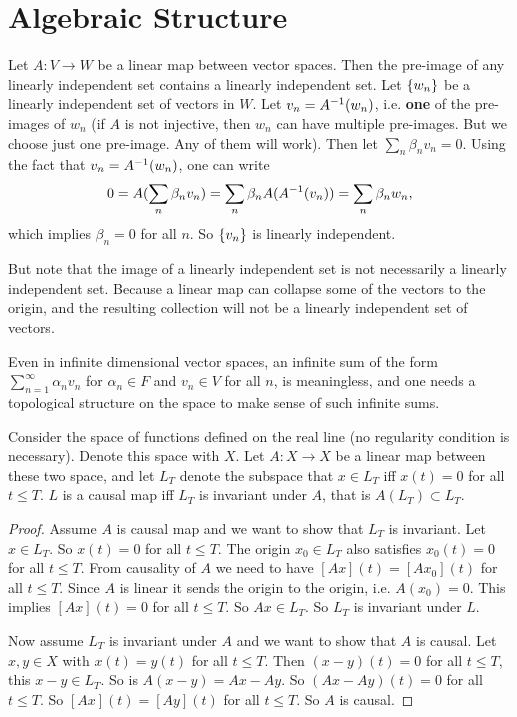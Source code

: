 \chapter{Algebraic Structure}


\begin{summary}
	Let $ A:V\to W $ be a linear map between vector spaces. Then the pre-image of any linearly independent set contains a linearly independent set. Let $ \{w_n\} $ be a linearly independent set of vectors in $ W $. Let $ v_n = A^{-1}(w_n) $, i.e. \textbf{one} of the pre-images of $ w_n $ (if $ A $ is not injective, then $ w_n $ can have multiple pre-images. But we choose just one pre-image. Any of them will work). Then let $ \sum_n \beta_n v_n = 0 $. Using the fact that $ v_n = A^{-1}(w_n) $, one can write
	\[ 0 = A(\sum_n \beta_n v_n) = \sum_n \beta_n A(A^{-1}(v_n)) = \sum_n \beta_n w_n,  \]
	which implies $ \beta_n = 0 $ for all $ n $. So $ \{v_n\} $ is linearly independent.
	
	But note that the image of a linearly independent set is not necessarily a linearly independent set. Because a linear map can collapse some of the vectors to the origin, and the resulting collection will not be a linearly independent set of vectors. 
\end{summary}

\begin{summary}
	Even in infinite dimensional vector spaces, an infinite sum of the form $ \sum_{n=1}^{\infty} \alpha_n v_n $ for $ \alpha_n \in F $ and $ v_n\in V $ for all $ n $, is  meaningless, and one needs a topological structure on the space to make sense of such infinite sums.
\end{summary}


\begin{summary}
	Consider the space of functions defined on the real line (no regularity condition is necessary). Denote this space with $ X $. Let $ A:X\to X $ be a linear map between these two space, and let $ L_T $ denote the subspace that $ x\in L_T $ iff $ x(t) = 0 $ for all $ t\leq T $. $ L $ is a causal map iff $ L_T $ is invariant under $ A $, that is $ A(L_T) \subset L_T $.
	
	\begin{proof}
		Assume $ A $ is causal map and we want to show that $ L_T $ is invariant. Let $ x\in L_T $. So $ x(t) = 0 $ for all $ t\leq T $. The origin $ x_0 \in L_T $ also satisfies $ x_0(t)=0 $ for all $ t\leq T $. From causality of $ A $ we need to have $ [Ax](t) = [Ax_0](t) $ for all $ t\leq T $. Since $ A $ is linear it sends the origin to the origin, i.e. $ A(x_0) =0 $. This implies $ [Ax](t) =0 $ for all $ t\leq T $. So $ Ax \in L_T $. So $ L_T $ is invariant under $ L $.
		
		Now assume $ L_T $ is invariant under $ A $ and we want to show that $ A $ is causal. Let $ x,y\in X $ with $ x(t) = y(t) $ for all $ t\leq T $. Then $ (x-y)(t) = 0 $ for all $ t\leq T $, this $ x-y\in L_T $. So is $ A(x-y) = Ax - Ay $. So $ (Ax-Ay)(t) = 0 $ for all $ t\leq T $. So $ [Ax](t) = [Ay](t) $ for all $ t\leq T $. So $ A $ is causal.
	\end{proof}
\end{summary}

